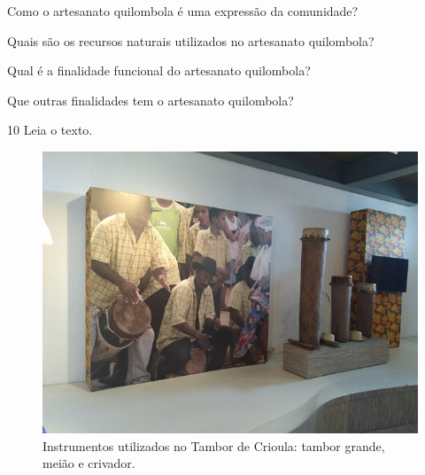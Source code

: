 \begin{escolha}
\item Como o artesanato quilombola é uma expressão da comunidade?\\

\item Quais são os recursos naturais utilizados no artesanato quilombola?\\

\item Qual é a finalidade funcional do artesanato quilombola?\\

\item Que outras finalidades tem o artesanato quilombola?\\
\end{escolha}

\num{10} Leia o texto.

\begin{figure}[htpb!]
\includegraphics[width=\textwidth]{./imgs/art29.png}
\caption{Instrumentos utilizados no Tambor de Crioula: tambor grande, meião e crivador.}
\end{figure}

